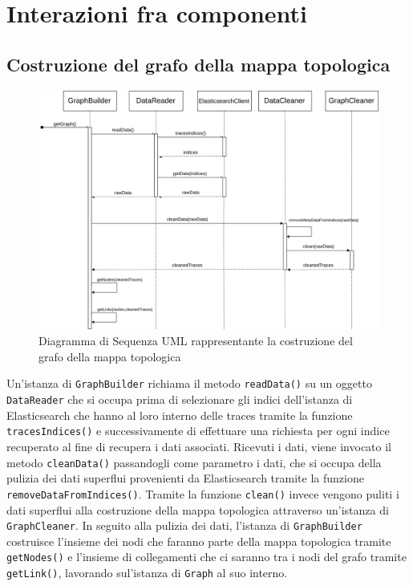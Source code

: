 
\section{Interazioni fra componenti}
\label{sec:Interazioni}
\subsection{Costruzione del grafo della mappa topologica}

\begin{figure}[H]
	\centering
	\includegraphics[width=1\textwidth]{Images/DiagrammaSequenzaGraph.png}
	\caption{Diagramma di Sequenza UML rappresentante la costruzione del grafo della mappa topologica}
	\label{img:seqGraph}
\end{figure}

Un'istanza di \texttt{GraphBuilder} richiama il metodo \texttt{readData()} su un oggetto \texttt{DataReader} che si occupa prima di selezionare gli indici dell'istanza di Elasticsearch che hanno al loro interno delle traces tramite la funzione \texttt{tracesIndices()} e successivamente di effettuare una richiesta per ogni indice recuperato al fine di recupera i dati associati.
Ricevuti i dati, viene invocato il metodo \texttt{cleanData()} passandogli come parametro i dati, che si occupa della pulizia dei dati superflui provenienti da Elasticsearch tramite la funzione \texttt{removeDataFromIndices()}. Tramite la funzione \texttt{clean()} invece vengono puliti i dati superflui alla costruzione della mappa topologica attraverso un'istanza di \texttt{GraphCleaner}.
In seguito alla pulizia dei dati, l'istanza di \texttt{GraphBuilder} costruisce l'insieme dei nodi che faranno parte della mappa topologica tramite \texttt{getNodes()} e l'insieme di collegamenti che ci saranno tra i nodi del grafo tramite \texttt{getLink()}, lavorando sul'istanza di \texttt{Graph} al suo interno.


